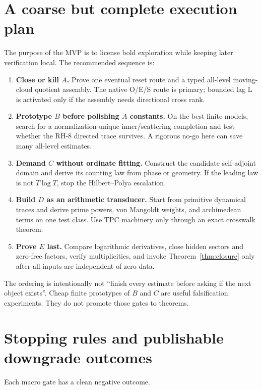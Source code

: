 \documentclass[11pt]{article}
\theoremstyle{definition}
\theoremstyle{remark}
\begin{document}
\section{A coarse but complete execution plan}

The purpose of the MVP is to license bold exploration while keeping later
verification local.  The recommended sequence is:

\begin{enumerate}[label=\textbf{MVP-\arabic*.},leftmargin=4.2em]
\item \textbf{Close or kill $A$.}  Prove one eventual reset route and a typed
all-level moving-cloud quotient assembly.  The native O/E/S route is primary;
bounded lag L is activated only if the assembly needs directional cross rank.
\item \textbf{Prototype $B$ before polishing $A$ constants.}  On the best
finite models, search for a normalization-unique inner/scattering completion
and test whether the RH-8 directed trace survives.  A rigorous no-go here can
save many all-level estimates.
\item \textbf{Demand $C$ without ordinate fitting.}  Construct the candidate
self-adjoint domain and derive its counting law from phase or geometry.  If
the leading law is not $T\log T$, stop the Hilbert--Polya escalation.
\item \textbf{Build $D$ as an arithmetic transducer.}  Start from primitive
dynamical traces and derive prime powers, von Mangoldt weights, and
archimedean terms on one test class.  Use TPC machinery only through an exact
crosswalk theorem.
\item \textbf{Prove $E$ last.}  Compare logarithmic derivatives, close hidden
sectors and zero-free factors, verify multiplicities, and invoke
Theorem~\ref{thm:closure} only after all inputs are independent of zero data.
\end{enumerate}

The ordering is intentionally not ``finish every estimate before asking if
the next object exists''.  Cheap finite prototypes of $B$ and $C$ are useful
falsification experiments.  They do not promote those gates to theorems.

\section{Stopping rules and publishable downgrade outcomes}

Each macro gate has a clean negative outcome.
\end{document}
